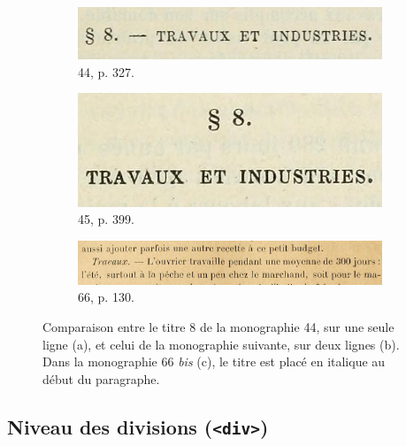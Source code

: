 \begin{figure}[t]
    \centering
    \begin{subfigure}{0.4\textwidth}
     \includegraphics[width=1\linewidth]{img/titre_8_mono_44_p_327.jpg}
     \caption{\no{}44, p. 327.}
     \label{fig:titre8_44}
    \end{subfigure}
    \hspace{5pt}
    \begin{subfigure}{0.3\textwidth}
     \includegraphics[width=1\linewidth]{img/titre_8_mono_45_p_399.jpg}
     \caption{\no{}45, p. 399.}
     \label{fig:titre8_45}
    \end{subfigure}
    \begin{subfigure}{0.8\textwidth}
     \includegraphics[width=1\linewidth]{img/titre_8_mono_66_p_130.jpg}
     \caption{\no{}66, p. 130.}
     \label{fig:titre8_66b}
    \end{subfigure}
    \caption[Comparaison entre les titres 8 des monographies \nos{}44, 45 et 66 \textit{bis}.]{Comparaison entre le titre 8 de la monographie \no{}44, sur une seule ligne (a), et celui de la monographie suivante, sur deux lignes (b). Dans la monographie \no{}66 \textit{bis} (c), le titre est placé en italique au début du paragraphe.}
    \label{fig:titre8}
\end{figure}

\subsection{Niveau des divisions (\texttt{<div>})}

